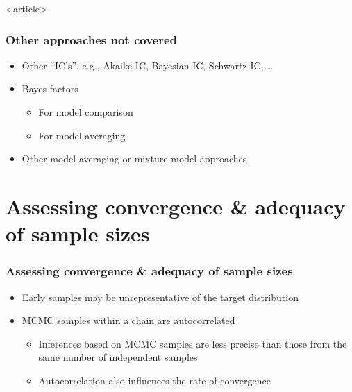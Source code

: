 \documentclass[handout]{beamer}
\begin{document}
\begin{frame}<article>
  \frametitle{Other approaches not covered}
  
  \begin{itemize}
  \item Other “IC’s”, e.g., Akaike IC, Bayesian IC, Schwartz IC, …
  \item Bayes factors
    \begin{itemize}
    \item For model comparison
    \item For model averaging
    \end{itemize}
  \item Other model averaging or mixture model approaches
  \end{itemize}

\end{frame}


\section{Assessing convergence \& adequacy of sample sizes}

\begin{frame}
  \frametitle{Assessing convergence \& adequacy of sample sizes}
  
\begin{itemize}
\item Early samples may be unrepresentative of the target distribution
\item MCMC samples within a chain are autocorrelated 
\begin{itemize}
\item Inferences based on MCMC samples are less precise than those from the same number of independent samples
\item Autocorrelation also influences the rate of convergence
\end{itemize}
\end{itemize}

\end{frame}
\end{document}
